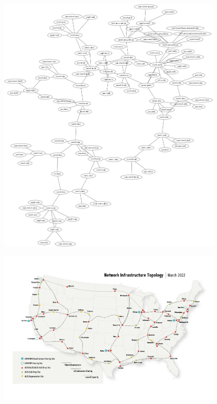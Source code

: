 \begin{figure}[h]
    \centering
    \begin{minipage}{0.6\textwidth}
        \centering
        \begin{adjustbox}{frame, bgcolor=black, center}
            \includegraphics[width=\linewidth]{images/lldp_graph.png}
        \end{adjustbox}
        \label{fig:image1}
    \end{minipage}
    \hfill
    \begin{minipage}{0.6\textwidth}
        \centering
        \begin{adjustbox}{frame, bgcolor=black, center}
            \includegraphics[width=\linewidth]{images/internet2.png}
        \end{adjustbox}
        \label{fig:image2}
    \end{minipage}
\end{figure}
